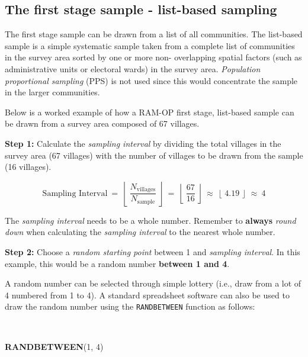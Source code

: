 \documentclass[12pt,a4paper]{book}
\newenvironment{Shaded}{\begin{snugshade}}{\end{snugshade}}
\newcommand{\KeywordTok}[1]{\textcolor[rgb]{0.13,0.29,0.53}{\textbf{#1}}}
\newcommand{\DecValTok}[1]{\textcolor[rgb]{0.00,0.00,0.81}{#1}}
\newcommand{\NormalTok}[1]{#1}
\theoremstyle{definition}
\theoremstyle{definition}
\theoremstyle{definition}
\theoremstyle{remark}
\begin{document}
\hypertarget{the-first-stage-sample---list-based-sampling}{%
\subsection{The first stage sample - list-based
sampling}\label{the-first-stage-sample---list-based-sampling}}

The first stage sample can be drawn from a list of all communities. The
list-based sample is a simple systematic sample taken from a complete
list of communities in the survey area sorted by one or more non-
overlapping spatial factors (such as administrative units or electoral
wards) in the survey area. \emph{Population proportional sampling} (PPS)
is not used since this would concentrate the sample in the larger
communities.

Below is a worked example of how a RAM-OP first stage, list-based sample
can be drawn from a survey area composed of 67 villages.

\textbf{Step 1:} Calculate the \emph{sampling interval} by dividing the
total villages in the survey area (67 villages) with the number of
villages to be drawn from the sample (16 villages).

\[\text{Sampling Interval} ~ = ~ \left \lfloor ~ \frac{N_{\text{villages}}}{N_{\text{sample}}} ~ \right \rfloor ~ = ~ \left \lfloor ~ \frac{67}{16} ~ \right \rfloor ~ \approx ~ \left \lfloor ~ 4.19 ~ \right \rfloor ~ \approx ~ 4\]

The \emph{sampling interval} needs to be a whole number. Remember to
\textbf{always} \emph{round down} when calculating the \emph{sampling
interval} to the nearest whole number.

\textbf{Step 2:} Choose a \emph{random starting point} between 1 and
\emph{sampling interval}. In this example, this would be a random number
\textbf{between 1 and 4}.

A random number can be selected through simple lottery (i.e., draw from
a lot of 4 numbered from 1 to 4). A standard spreadsheet software can
also be used to draw the random number using the \texttt{RANDBETWEEN}
function as follows:

~

\begin{Shaded}
\begin{Highlighting}[]
\KeywordTok{RANDBETWEEN}\NormalTok{(}\DecValTok{1}\NormalTok{, }\DecValTok{4}\NormalTok{)}
\end{Highlighting}
\end{Shaded}
\end{document}

